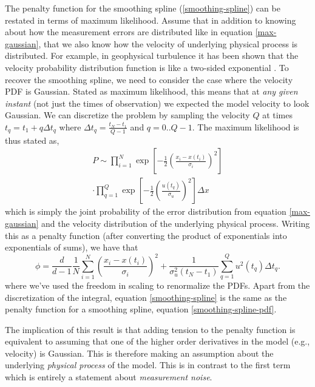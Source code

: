 \documentclass[10pt,journal]{IEEEtran}
\begin{document}
The penalty function for the smoothing spline (\ref{smoothing-spline}) can be restated in terms of maximum likelihood. Assume that in addition to knowing about how the measurement errors are distributed like in equation \ref{max-gaussian}, that we also know how the velocity of underlying physical process is distributed. For example, in geophysical turbulence it has been shown that the velocity probability distribution function is like a two-sided exponential \cite{bracco2000-pf}. To recover the smoothing spline, we need to consider the case where the velocity PDF is Gaussian. Stated as maximum likelihood, this means that at \emph{any given instant} (not just the times of observation) we expected the model velocity to look Gaussian. We can discretize the problem by sampling the velocity $Q$ at times $t_q = t_1 + q \Delta t_q$ where $\Delta t_q=\frac{t_N-t_1}{Q-1}$ and $q=0..Q-1$. The maximum likelihood is thus stated as,
\begin{equation}
\label{gaussian-max-likelihood}
\begin{split}
P \sim \prod^N _{i=1}\exp \left[ -\frac{1}{2} \left( \frac{x_i - x(t_i)}{\sigma_i} \right)^2 \right] \\\cdot \prod^{Q}_{q=1} \exp \left[  - \frac{1}{2} \left(  \frac{u(t_q)}{\sigma_u} \right)^2 \right] \Delta x
\end{split}
\end{equation}
which is simply the joint probability of the error distribution from equation \ref{max-gaussian} and the velocity distribution of the underlying physical process. Writing this as a penalty function (after converting the product of exponentials into exponentials of sums), we have that
\begin{equation}
\label{smoothing-spline-pdf}
\phi =\frac{d}{d-1}  \frac{1}{N} \sum^N _{i=1}  \left( \frac{x_i - x(t_i)}{\sigma_i} \right)^2 + \frac{1}{\sigma_u^2 (t_N-t_1)} \sum^{Q}_{q=1}  u^2(t_q) \Delta t_q.
\end{equation}
where we've used the freedom in scaling to renormalize the PDFs. Apart from the discretization of the integral, equation \ref{smoothing-spline} is the same as the penalty function for a smoothing spline, equation \ref{smoothing-spline-pdf}.

The implication of this result is that adding tension to the penalty function is equivalent to assuming that one of the higher order derivatives in the model (e.g., velocity) is Gaussian. This is therefore making an assumption about the underlying \emph{physical process} of the model. This is in contrast to the first term which is entirely a statement about \emph{measurement noise}.
\end{document}
